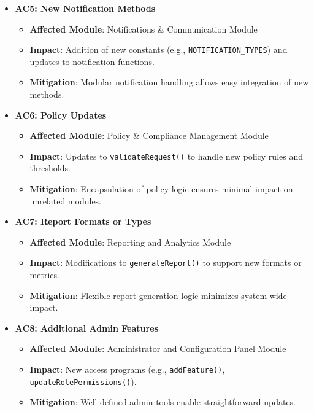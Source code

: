 \documentclass[12pt, titlepage]{article}
\begin{document}
\begin{itemize}
    \item \textbf{AC5: New Notification Methods}
    \begin{itemize}
        \item \textbf{Affected Module}: Notifications \& Communication Module
        \item \textbf{Impact}: Addition of new constants (e.g., \texttt{NOTIFICATION\_TYPES}) and updates to notification functions.
        \item \textbf{Mitigation}: Modular notification handling allows easy integration of new methods.
    \end{itemize}
    
    \item \textbf{AC6: Policy Updates}
    \begin{itemize}
        \item \textbf{Affected Module}: Policy \& Compliance Management Module
        \item \textbf{Impact}: Updates to \texttt{validateRequest()} to handle new policy rules and thresholds.
        \item \textbf{Mitigation}: Encapsulation of policy logic ensures minimal impact on unrelated modules.
    \end{itemize}
    
    \item \textbf{AC7: Report Formats or Types}
    \begin{itemize}
        \item \textbf{Affected Module}: Reporting and Analytics Module
        \item \textbf{Impact}: Modifications to \texttt{generateReport()} to support new formats or metrics.
        \item \textbf{Mitigation}: Flexible report generation logic minimizes system-wide impact.
    \end{itemize}
    
    \item \textbf{AC8: Additional Admin Features}
    \begin{itemize}
        \item \textbf{Affected Module}: Administrator and Configuration Panel Module
        \item \textbf{Impact}: New access programs (e.g., \texttt{addFeature()}, \texttt{updateRolePermissions()}).
        \item \textbf{Mitigation}: Well-defined admin tools enable straightforward updates.
    \end{itemize}
\end{itemize}
\end{document}
